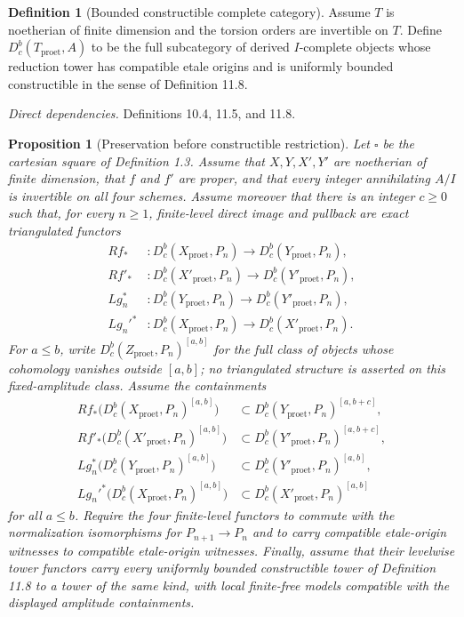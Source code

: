 \documentclass[10pt]{article}
\newtheorem{proposition}[theorem]{Proposition}
\theoremstyle{definition}
\newtheorem{definition}[theorem]{Definition}
\newcommand{\Dbc}{D^b_c}
\newcommand{\Proet}{\mathrm{proet}}
\newcommand{\deps}[1]{\par\smallskip\textit{Direct dependencies.} #1\par}
\begin{document}
\begin{definition}[Bounded constructible complete category]
Assume $T$ is noetherian of finite dimension and the torsion orders are
invertible on $T$.  Define $\Dbc(T_{\Proet},A)$ to be the full subcategory
of derived $I$-complete objects whose reduction tower has compatible etale
origins and is uniformly bounded constructible in the sense of Definition
11.8.
\end{definition}
\deps{Definitions 10.4, 11.5, and 11.8.}

\begin{proposition}[Preservation before constructible restriction]
Let $\square$ be the cartesian square of Definition 1.3.  Assume that
$X,Y,X',Y'$ are noetherian of finite dimension, that $f$ and $f'$ are
proper, and that every integer annihilating $A/I$ is invertible on all four
schemes.  Assume moreover that there is an integer $c\geq0$ such that, for
every $n\geq1$, finite-level direct image and pullback are exact
triangulated functors
\[
\begin{aligned}
 Rf_* &:D^b_c(X_{\Proet},P_n)\longrightarrow
        D^b_c(Y_{\Proet},P_n),\\
 Rf'_* &:D^b_c(X'_{\Proet},P_n)\longrightarrow
         D^b_c(Y'_{\Proet},P_n),\\
 Lg_n^* &:D^b_c(Y_{\Proet},P_n)\longrightarrow
          D^b_c(Y'_{\Proet},P_n),\\
 Lg_n'^* &:D^b_c(X_{\Proet},P_n)\longrightarrow
           D^b_c(X'_{\Proet},P_n).
\end{aligned}
\]
For $a\leq b$, write $D^b_c(Z_{\Proet},P_n)^{[a,b]}$ for the full class of
objects whose cohomology vanishes outside $[a,b]$; no triangulated structure
is asserted on this fixed-amplitude class.  Assume the containments
\[
\begin{aligned}
 Rf_*\bigl(D^b_c(X_{\Proet},P_n)^{[a,b]}\bigr)
 &\subset D^b_c(Y_{\Proet},P_n)^{[a,b+c]},\\
 Rf'_*\bigl(D^b_c(X'_{\Proet},P_n)^{[a,b]}\bigr)
 &\subset D^b_c(Y'_{\Proet},P_n)^{[a,b+c]},\\
 Lg_n^*\bigl(D^b_c(Y_{\Proet},P_n)^{[a,b]}\bigr)
 &\subset D^b_c(Y'_{\Proet},P_n)^{[a,b]},\\
 Lg_n'^*\bigl(D^b_c(X_{\Proet},P_n)^{[a,b]}\bigr)
 &\subset D^b_c(X'_{\Proet},P_n)^{[a,b]}
\end{aligned}
\]
for all $a\leq b$.  Require the four finite-level functors to commute with
the normalization isomorphisms for $P_{n+1}\to P_n$ and to carry compatible
etale-origin witnesses to compatible etale-origin witnesses.  Finally,
assume that their levelwise tower functors carry every uniformly bounded
constructible tower of Definition 11.8 to a tower of the same kind, with
local finite-free models compatible with the displayed amplitude
containments.


\end{proposition}
\end{document}
